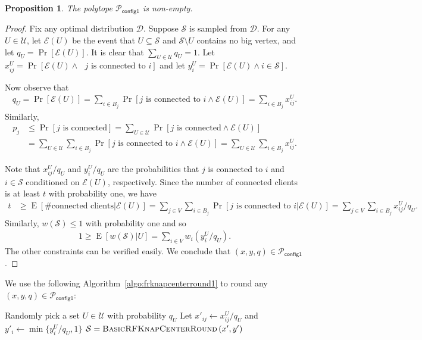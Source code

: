 \documentclass[a4paper,11pt]{article}
\newtheorem{proposition}[theorem]{Proposition}
\DeclareMathOperator*{\E}{\mathrm{E}}
\newcommand{\D}{\mathcal{D}}
\renewcommand{\S}{\mathcal{S}}
\newcommand{\U}{\mathcal{U}}
\renewcommand{\P}{\mathcal{P}}
\newcommand{\e}{\mathcal{E}}
\begin{document}
\begin{proposition} The polytope $\P_\textsf{config1}$ is non-empty.
\label{prop:relaxation_knapcenter}
\end{proposition}
\begin{proof}
Fix any optimal distribution $\D$. Suppose $\S$ is sampled from $\D$. For any $U \in \U$, let $\e(U)$ be the event that $U \subseteq \S$ and $\S \setminus U$ contains no big vertex, and let $q_U = \Pr[ \e(U) ]$. It is clear that $\sum_{U \in \U} q_U = 1$. Let $x^{U}_{ij} = \Pr[ \e(U) \wedge \text{ $j$ is connected to $i$}]$ and let $y^{U}_i = \Pr[ \e(U) \wedge i \in \S]$.

Now observe that
\begin{align*}
	q_U = \Pr[\e(U)] = \sum_{i \in B_j} \Pr[ j \text{ is connected to }i \wedge  \e(U) ] = \sum_{i \in B_j} x^{U}_{ij}.
\end{align*}
Similarly,
\begin{align*}
	p_j &\leq \Pr[j \text{ is connected}] = \sum_{U \in \U} \Pr[j \text{ is connected} \wedge \e(U)] \\
		&= \sum_{U \in \U} \sum_{i \in B_j} \Pr[j \text{ is connected to }i \wedge \e(U)] = \sum_{U \in \U} \sum_{i \in B_j} x^{U}_{ij}.
\end{align*}


Note that $x^{U}_{ij}/q_U$ and $y^{U}_i/q_U$ are the probabilities that $j$ is connected to $i$ and $i \in \S$ conditioned on $\e(U)$, respectively. Since the number of connected clients is at least $t$ with probability one, we have
\begin{align*}
	t &\geq \E[\text{\# connected clients} | \e(U)] = \sum_{j \in V} \sum_{i \in B_j} \Pr[j \text{ is connected to } i | \e(U)] = \sum_{j \in V} \sum_{i \in B_j} x^{U}_{ij} / q_U.
\end{align*}
Similarly, $w(\S) \leq 1$ with probability one and so
\begin{align*}
	1 \geq \E[w(\S) | U] =  \sum_{i \in V} w_i (y^{U}_i/q_U). 
\end{align*}
The other constraints can be verified easily. We conclude that $(x,y,q) \in \P_\textsf{config1}$.
\end{proof}

We use the following Algorithm~\ref{algo:frknapcenterround1} to round any $(x,y,q) \in \P_\textsf{config1}$:

\begin{algorithm}[h]
\caption{$\textsc{FRKnapCenterRound1}\left(x,y,q \right)$}
\begin{algorithmic}[1]
\STATE Randomly pick a set $U \in \U$ with probability $q_U$
\STATE Let $x'_{ij} \gets x^{U}_{ij}/q_U$ and $y'_i \gets \min\{y_i^U/q_U, 1\}$
\RETURN $\S = \textsc{BasicRFKnapCenterRound}\left(x', y' \right)$
\end{algorithmic} 
\label{algo:frknapcenterround1}
\end{algorithm}
\end{document}
